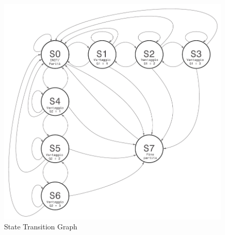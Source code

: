\documentclass[a4paper]{report}
\begin{document}
\begin{figure}[ht]
  \centering
  \includegraphics[width=\textwidth]{FSMTG.pdf}
  \caption{State Transition Graph}
  \label{img:fsmtg}
\end{figure}
\end{document}
